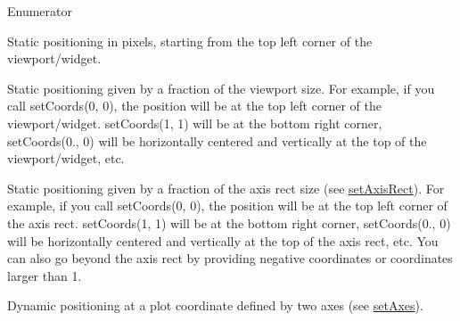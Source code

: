 \begin{Desc}
\item[Enumerator]\par
\begin{description}
\item[{\em 
pt\+Absolute\hypertarget{class_q_c_p_item_position_aad9936c22bf43e3d358552f6e86dbdc8a564f5e53e550ead1ec5fc7fc7d0b73e0}{}\label{class_q_c_p_item_position_aad9936c22bf43e3d358552f6e86dbdc8a564f5e53e550ead1ec5fc7fc7d0b73e0}
}]Static positioning in pixels, starting from the top left corner of the viewport/widget. \item[{\em 
pt\+Viewport\+Ratio\hypertarget{class_q_c_p_item_position_aad9936c22bf43e3d358552f6e86dbdc8ac7d6aa89ceacb39658b0d6da061c789a}{}\label{class_q_c_p_item_position_aad9936c22bf43e3d358552f6e86dbdc8ac7d6aa89ceacb39658b0d6da061c789a}
}]Static positioning given by a fraction of the viewport size. For example, if you call set\+Coords(0, 0), the position will be at the top left corner of the viewport/widget. set\+Coords(1, 1) will be at the bottom right corner, set\+Coords(0., 0) will be horizontally centered and vertically at the top of the viewport/widget, etc. \item[{\em 
pt\+Axis\+Rect\+Ratio\hypertarget{class_q_c_p_item_position_aad9936c22bf43e3d358552f6e86dbdc8a01080fd00eaf09fa238ef6b73bbfef75}{}\label{class_q_c_p_item_position_aad9936c22bf43e3d358552f6e86dbdc8a01080fd00eaf09fa238ef6b73bbfef75}
}]Static positioning given by a fraction of the axis rect size (see \hyperlink{class_q_c_p_item_position_a0cd9b326fb324710169e92e8ca0041c2}{set\+Axis\+Rect}). For example, if you call set\+Coords(0, 0), the position will be at the top left corner of the axis rect. set\+Coords(1, 1) will be at the bottom right corner, set\+Coords(0., 0) will be horizontally centered and vertically at the top of the axis rect, etc. You can also go beyond the axis rect by providing negative coordinates or coordinates larger than 1. \item[{\em 
pt\+Plot\+Coords\hypertarget{class_q_c_p_item_position_aad9936c22bf43e3d358552f6e86dbdc8ad5ffb8dc99ad73263f7010c77342294c}{}\label{class_q_c_p_item_position_aad9936c22bf43e3d358552f6e86dbdc8ad5ffb8dc99ad73263f7010c77342294c}
}]Dynamic positioning at a plot coordinate defined by two axes (see \hyperlink{class_q_c_p_item_position_a2185f45c75ac8cb9be89daeaaad50e37}{set\+Axes}). \end{description}
\end{Desc}


